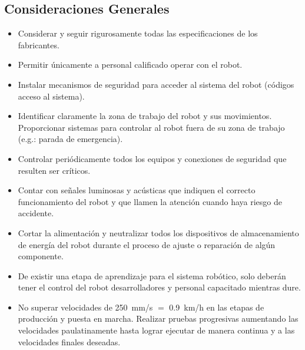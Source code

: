 \documentclass[withindex,glossary]{cam-thesis}
\begin{document}
\subsection{Consideraciones Generales}
\begin{itemize}
  \item Considerar y seguir rigurosamente todas las especificaciones de los fabricantes.
  \item Permitir únicamente a personal calificado operar con el robot.
  \item Instalar mecanismos de seguridad para acceder al sistema del robot (códigos acceso al sistema).
  \item Identificar claramente la zona de trabajo del robot y sus movimientos. Proporcionar sistemas para controlar al robot fuera de su zona de trabajo (e.g.: parada de emergencia).
  \item Controlar periódicamente todos los equipos y conexiones de seguridad que resulten ser críticos.
  \item Contar con señales luminosas y acústicas que indiquen el correcto funcionamiento del robot y que llamen la atención cuando haya riesgo de accidente.
  \item Cortar la alimentación y neutralizar todos los dispositivos de almacenamiento de energía del robot durante el proceso de ajuste o reparación de algún componente.
  \item De existir una etapa de aprendizaje para el sistema robótico, solo deberán tener el control del robot desarrolladores y personal capacitado mientras dure.
  \item No superar velocidades de \SI{250}{\milli\metre/\second} $=$ \SI{0.9}{\kilo\metre/\hour} en las etapas de producción y puesta en marcha. Realizar pruebas progresivas aumentando las velocidades paulatinamente hasta lograr ejecutar de manera continua y a las velocidades finales deseadas.
\end{itemize}
\end{document}
